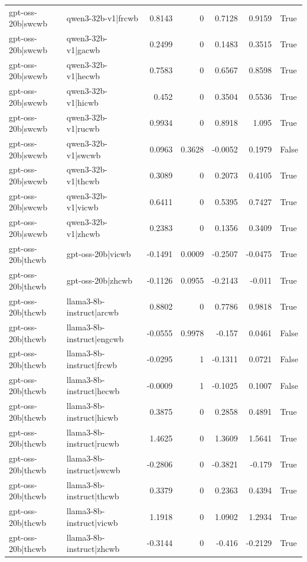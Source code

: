 \begin{table}
\begin{tabular}{l l r r r r l}
gpt-oss-20b|swcwb & qwen3-32b-v1|frcwb & 0.8143 & 0 & 0.7128 & 0.9159 & True \\
gpt-oss-20b|swcwb & qwen3-32b-v1|gacwb & 0.2499 & 0 & 0.1483 & 0.3515 & True \\
gpt-oss-20b|swcwb & qwen3-32b-v1|hecwb & 0.7583 & 0 & 0.6567 & 0.8598 & True \\
gpt-oss-20b|swcwb & qwen3-32b-v1|hicwb & 0.452 & 0 & 0.3504 & 0.5536 & True \\
gpt-oss-20b|swcwb & qwen3-32b-v1|rucwb & 0.9934 & 0 & 0.8918 & 1.095 & True \\
gpt-oss-20b|swcwb & qwen3-32b-v1|swcwb & 0.0963 & 0.3628 & -0.0052 & 0.1979 & False \\
gpt-oss-20b|swcwb & qwen3-32b-v1|thcwb & 0.3089 & 0 & 0.2073 & 0.4105 & True \\
gpt-oss-20b|swcwb & qwen3-32b-v1|vicwb & 0.6411 & 0 & 0.5395 & 0.7427 & True \\
gpt-oss-20b|swcwb & qwen3-32b-v1|zhcwb & 0.2383 & 0 & 0.1356 & 0.3409 & True \\
gpt-oss-20b|thcwb & gpt-oss-20b|vicwb & -0.1491 & 0.0009 & -0.2507 & -0.0475 & True \\
gpt-oss-20b|thcwb & gpt-oss-20b|zhcwb & -0.1126 & 0.0955 & -0.2143 & -0.011 & True \\
gpt-oss-20b|thcwb & llama3-8b-instruct|arcwb & 0.8802 & 0 & 0.7786 & 0.9818 & True \\
gpt-oss-20b|thcwb & llama3-8b-instruct|engcwb & -0.0555 & 0.9978 & -0.157 & 0.0461 & False \\
gpt-oss-20b|thcwb & llama3-8b-instruct|frcwb & -0.0295 & 1 & -0.1311 & 0.0721 & False \\
gpt-oss-20b|thcwb & llama3-8b-instruct|hecwb & -0.0009 & 1 & -0.1025 & 0.1007 & False \\
gpt-oss-20b|thcwb & llama3-8b-instruct|hicwb & 0.3875 & 0 & 0.2858 & 0.4891 & True \\
gpt-oss-20b|thcwb & llama3-8b-instruct|rucwb & 1.4625 & 0 & 1.3609 & 1.5641 & True \\
gpt-oss-20b|thcwb & llama3-8b-instruct|swcwb & -0.2806 & 0 & -0.3821 & -0.179 & True \\
gpt-oss-20b|thcwb & llama3-8b-instruct|thcwb & 0.3379 & 0 & 0.2363 & 0.4394 & True \\
gpt-oss-20b|thcwb & llama3-8b-instruct|vicwb & 1.1918 & 0 & 1.0902 & 1.2934 & True \\
gpt-oss-20b|thcwb & llama3-8b-instruct|zhcwb & -0.3144 & 0 & -0.416 & -0.2129 & True \\

\end{tabular}
\end{table}
